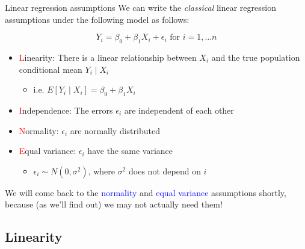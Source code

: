 \documentclass[10pt,t]{beamer}
\begin{document}
\begin{frame}{Linear regression assumptions}
We can write the \textit{classical} linear regression assumptions under the following model as follows:

$$
Y_i = \beta_0 + \beta_1 X_i + \epsilon_i \text{ for } i = 1, \dots n
$$

\begin{itemize}
	\item \textcolor{red}{L}inearity: There is a linear relationship between $X_i$ and the true population conditional mean $Y_i \mid X_i$
	\begin{itemize}
		\item i.e. $E[Y_i \mid X_i] = \beta_0 + \beta_1 X_i$
	\end{itemize}
	\item \textcolor{red}{I}ndependence: The errors $\epsilon_i$ are independent of each other
	\item \textcolor{red}{N}ormality: $\epsilon_i$ are normally distributed
	\item \textcolor{red}{E}qual variance: $\epsilon_i$ have the same variance
	\begin{itemize}
		\item $\epsilon_i \sim N(0, \sigma^2)$, where $\sigma^2$ does not depend on $i$
	\end{itemize}
\end{itemize}

\vspace{0.3cm}

We will come back to the \textcolor{blue}{normality} and \textcolor{blue}{equal variance} assumptions shortly, because (as we'll find out) we may not actually need them!
\end{frame}

\subsection{Linearity}
\end{document}
